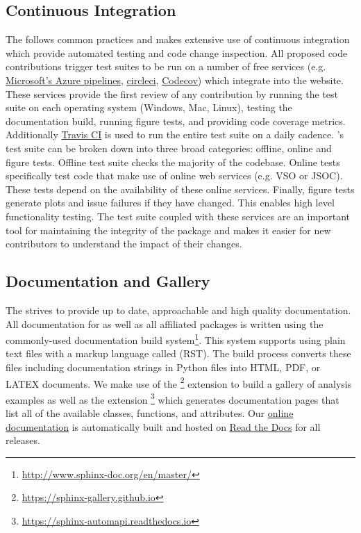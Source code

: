 \subsection{Continuous Integration}
The \sunpyproj follows common practices and makes extensive use of continuous integration which provide automated testing and code change inspection.
All proposed code contributions trigger test suites to be run on a number of free services (e.g.
\href{https://azure.microsoft.com/en-gb/services/devops/pipelines/}{Microsoft's Azure pipelines},
\href{https://circleci.com}{circleci},
\href{https://codecov.io/}{Codecov}) which integrate into the \github website.
These services provide the first review of any contribution by running the test suite on each operating system (Windows, Mac, Linux), testing the documentation build, running figure tests, and providing code coverage metrics.
Additionally \href{https://travis-ci.org}{Travis CI} is used to run the entire test suite on a daily cadence.
\sunpypkg's test suite can be broken down into three broad categories: offline, online and figure tests.
Offline test suite checks the majority of the codebase.
Online tests specifically test code that make use of online web services (e.g. VSO or JSOC).
These tests depend on the availability of these online services.
Finally, figure tests generate plots and issue failures if they have changed.
This enables high level functionality testing.
The \sunpypkg test suite coupled with these services are an important tool for maintaining the integrity of the package and makes it easier for new contributors to understand the impact of their changes.

\subsection{Documentation and Gallery}
The \sunpyproj strives to provide up to date, approachable and high quality documentation.
All documentation for \sunpypkg as well as all affiliated packages is written using the commonly-used  documentation build system\footnote{\url{http://www.sphinx-doc.org/en/master/}}.
This system supports using plain text files with a markup language called  (RST).
The build process converts these files including documentation strings in Python files into HTML, PDF, or LATEX documents.
We make use of the \footnote{\url{https://sphinx-gallery.github.io}} extension to build a gallery of analysis examples as well as the extension \footnote{\url{https://sphinx-automapi.readthedocs.io}} which generates documentation pages that list all of the available classes, functions, and attributes.
Our \href{http://docs.sunpy.org/en/stable/}{online documentation} is automatically built and hosted on \href{https://readthedocs.org/}{Read the Docs} for all releases.
